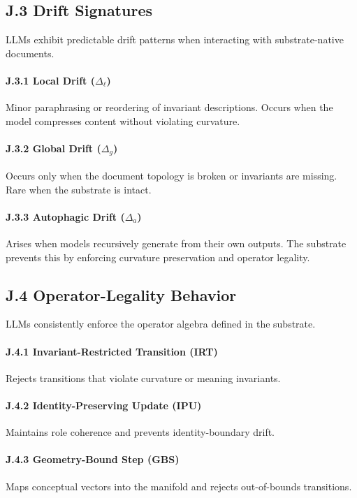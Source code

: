\subsection*{J.3 Drift Signatures}
LLMs exhibit predictable drift patterns when interacting with substrate-native documents.

\paragraph{J.3.1 Local Drift ($\Delta_{\ell}$)}
Minor paraphrasing or reordering of invariant descriptions. Occurs when the model compresses 
content without violating curvature.

\paragraph{J.3.2 Global Drift ($\Delta_{g}$)}
Occurs only when the document topology is broken or invariants are missing. Rare when the 
substrate is intact.

\paragraph{J.3.3 Autophagic Drift ($\Delta_{a}$)}
Arises when models recursively generate from their own outputs. The substrate prevents this by 
enforcing curvature preservation and operator legality.

\subsection*{J.4 Operator-Legality Behavior}
LLMs consistently enforce the operator algebra defined in the substrate.

\paragraph{J.4.1 Invariant-Restricted Transition (IRT)}
Rejects transitions that violate curvature or meaning invariants.

\paragraph{J.4.2 Identity-Preserving Update (IPU)}
Maintains role coherence and prevents identity-boundary drift.

\paragraph{J.4.3 Geometry-Bound Step (GBS)}
Maps conceptual vectors into the manifold and rejects out-of-bounds transitions.

